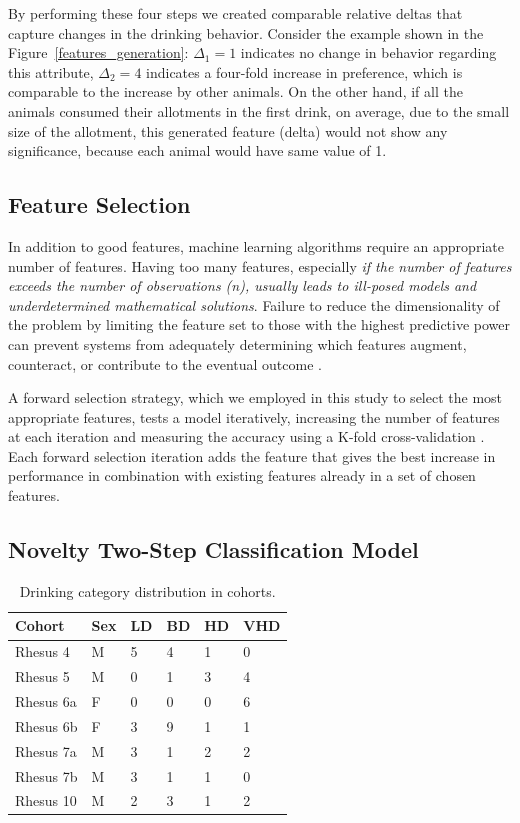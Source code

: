 	By performing these four steps we created comparable relative deltas that capture changes in the drinking behavior. Consider the example shown in the Figure~\ref{features_generation}: $\Delta_1=1$ indicates no change in behavior regarding this attribute, $\Delta_2=4$ indicates a four-fold increase in preference, which is comparable to the increase by other animals. On the other hand, if all the animals consumed their allotments in the first drink, on average, due to the small size of the allotment, this generated feature (delta) would not show any significance, because each animal would have same value of 1.

	\subsection{Feature Selection \label{section:feature-selection}}
	In addition to good features, machine learning algorithms require an appropriate number of features. Having too many features, especially \textit{if the number of features exceeds the number of observations (n), usually leads to ill-posed models and underdetermined mathematical solutions}. Failure to reduce the dimensionality of the problem by limiting the feature set to those with the highest predictive power can prevent systems from adequately determining which features augment, counteract, or contribute to the eventual outcome .
	
	A forward selection strategy, which we employed in this study to select the most appropriate features, tests a model iteratively, increasing the number of features at each iteration and measuring the accuracy using a K-fold cross-validation . Each forward selection iteration adds the feature that gives the best increase in performance in combination with existing features already in a set of chosen features. 

	\subsection{Novelty Two-Step Classification Model}	
	\begin{table}[h]
		\centering
		\caption{Drinking category distribution in cohorts. }
		\label{tab:dc-by-cohort}
		\begin{tabular}{llllll}
			\hline
			\abovespace\belowspace
			Cohort & Sex & LD & BD & HD & VHD\\
			\hline
			Rhesus 4  & M & 5 & 4 & 1 & 0 \\
			Rhesus 5  & M & 0 & 1 & 3 & 4 \\
			Rhesus 6a & F & 0 & 0 & 0 & 6\\
			Rhesus 6b & F & 3 & 9 & 1 & 1\\
			Rhesus 7a & M & 3 & 1 & 2 & 2\\
			Rhesus 7b & M & 3 & 1 & 1 & 0\\
			Rhesus 10 & M & 2 & 3 & 1 & 2\\
			\hline
		\end{tabular}
	\end{table}
	
